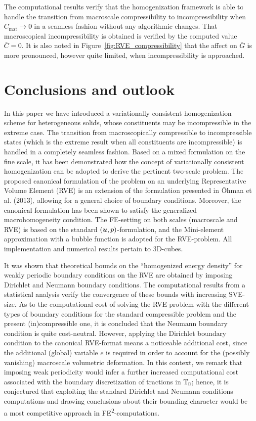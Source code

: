 \documentclass{bmcart}
\newcommand{\figref}[1]{Figure~\ref{#1}}
\newcommand{\rve}{
  {\mathchoice
   {\mbox{\scalebox{0.67}{$\Box$}}}
   {\mbox{\scalebox{0.67}{$\Box$}}}
   {\mbox{\scalebox{0.5}{$\Box$}}}
   {\mbox{\scalebox{0.375}{$\Box$}}}
  }
}
\begin{document}
The computational results verify that the homogenization framework is able to handle the transition from macroscale compressibility to incompressibility when $C_\mathrm{mat}\to 0$ in a seamless fashion without any algorithmic changes.
That macroscopical incompressibility is obtained is verified by the computed value $\bar{C} = 0$.
It is also noted in \figref{fig:RVE_compressibility} that the affect on $\bar{G}$ is more pronounced, however quite limited, when incompressibility is approached.

\section{Conclusions and outlook}
In this paper we have introduced a variationally consistent homogenization scheme for heterogeneous solids, whose constituents may be incompressible in the extreme case.
The transition from macroscopically compressible to incompressible states (which is the extreme result when all constituents are incompressible) is handled in a completely seamless fashion.
Based on a mixed formulation on the fine scale, it has been demonstrated how the concept of variationally consistent homogenization can be adopted to derive the pertinent two-scale problem.
The proposed canonical formulation of the problem on an underlying Representative Volume Element (RVE) is an extension of the formulation presented in Öhman et al. (2013), allowing for a general choice of boundary conditions.
Moreover, the canonical formulation has been shown to satisfy the generalized macrohomogeneity condition.
The FE-setting on both scales (macroscale and RVE) is based on the standard $(\boldsymbol{u},p)$-formulation, and the Mini-element approximation with a bubble function is adopted for the RVE-problem.
All implementation and numerical results pertain to 3D-cubes.

It was shown that theoretical bounds on the ``homogenized energy density'' for weakly periodic boundary conditions on the RVE are obtained by imposing Dirichlet and Neumann boundary conditions.
The computational results from a statistical analysis verify the convergence of these bounds with increasing SVE-size.
As to the computational cost of solving the RVE-problem with the different types of boundary conditions for the standard compressible problem and the present (in)compressible one, it is concluded that the Neumann boundary condition is quite cost-neutral.
However, applying the Dirichlet boundary condition to the canonical RVE-format means a noticeable additional cost, since the additional (global) variable $\bar{e}$ is required in order to account for the (possibly vanishing) macroscale volumetric deformation.
In this context, we remark that imposing weak periodicity would infer a further increased computational cost associated with the boundary discretization of tractions in $\set{T}_\rve$; hence, it is conjectured that exploiting the standard Dirichlet and Neumann conditions computations and drawing conclusions about their bounding character would be a most competitive approach in FE\textsuperscript{2}-computations.
\end{document}
